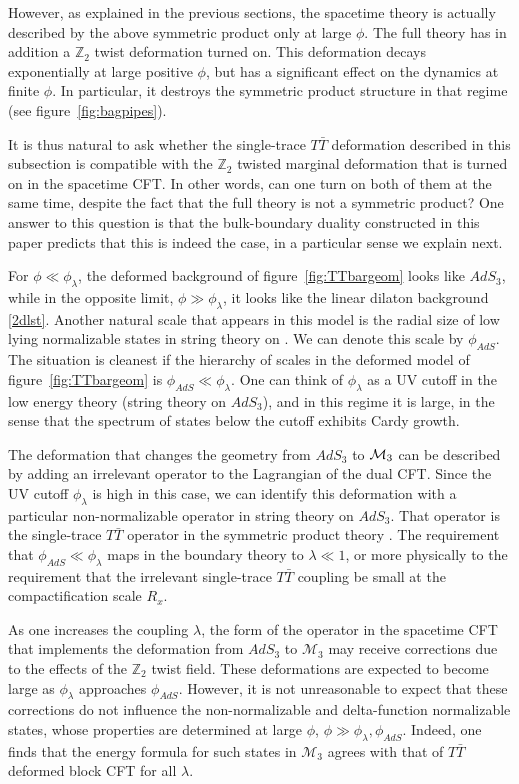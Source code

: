 \documentclass[12pt]{article}
\def\MM{{\mathcal{M}}}
\newcommand{\bZ}{{\mathbb Z}}
\numberwithin{equation}{section}
\def\cM{\mathcal {M}} \def\cN{\mathcal {N}} \def\cO{\mathcal {O}}
\def\MM{{\cal M}}
\begin{document}
However, as explained in the previous sections, the spacetime theory is actually described by the above symmetric product only at large $\phi$. The full theory has in addition a $\bZ_2$ twist deformation turned on. This deformation decays exponentially at large positive $\phi$, but has a significant effect on the dynamics at finite $\phi$. In particular, it destroys the symmetric product structure in that regime (see figure~\ref{fig:bagpipes}). 

It is thus natural to ask whether the single-trace $T\bar T$ deformation described in this subsection is compatible with the $\bZ_2$ twisted marginal deformation that is turned on in the spacetime CFT.  In other words, can one turn on both of them at the same time, despite the fact that the full theory is not a symmetric product? One answer to this question is that the bulk-boundary duality constructed in this paper predicts that this is indeed the case, in a particular sense we explain next.  

For $\phi\ll\phi_\lambda$, the deformed background of figure~\ref{fig:TTbargeom} looks like $AdS_3$, while in the opposite limit, $\phi\gg\phi_\lambda$, it looks like the linear dilaton background \eqref{2dlst}. Another natural scale that appears in this model is the radial size of low lying normalizable states in string theory on \ourads. We can denote this scale by $\phi_{AdS}$. The situation is cleanest if the hierarchy of scales in the deformed model of figure~\ref{fig:TTbargeom} is $\phi_{AdS}\ll\phi_\lambda$. One can think of $\phi_\lambda$ as a UV cutoff in the low energy theory (string theory on $AdS_3$), and in this regime it is large, in the sense that the spectrum of states below the cutoff exhibits Cardy growth. 

The deformation that changes the geometry from $AdS_3$ to $\MM_3$ can be described by adding an irrelevant operator to the Lagrangian of the dual CFT. Since the UV cutoff $\phi_\lambda$ is high in this case, we can identify this deformation with a particular non-normalizable operator in string theory on $AdS_3$. That operator is the single-trace $T\bar T$ operator in the symmetric product theory \ourcft. The requirement that $\phi_{AdS}\ll\phi_\lambda$ maps in the boundary theory to $\lambda\ll 1$, or more physically to the requirement that the irrelevant single-trace $T\bar T$ coupling be small at the compactification scale $R_x$.   

As one increases the coupling $\lambda$, the form of the operator in the spacetime CFT that implements the deformation from $AdS_3$ to $\cM_3$ may receive corrections due to the effects of the $\bZ_2$ twist field. These deformations are expected to become large as $\phi_\lambda$ approaches $\phi_{AdS}$. However, it is not unreasonable to expect that these corrections do not influence the non-normalizable and delta-function normalizable states, whose properties are determined at large $\phi$, $\phi\gg\phi_\lambda,\phi_{AdS}$. Indeed, one finds that the energy formula for such states in $\cM_3$ agrees with that of $T\bar T$ deformed block CFT for all $\lambda$.
\end{document}
